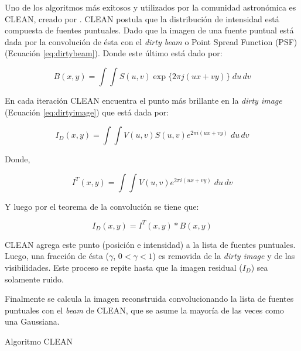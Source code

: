 Uno de los algoritmos más exitosos y utilizados por la comunidad astronómica es CLEAN, creado por \citep{hogbom}. CLEAN postula que la distribución de intensidad está compuesta de fuentes puntuales. Dado que la imagen de una fuente puntual está dada por la convolución de ésta con el \textit{dirty beam} o Point Spread Function (PSF) (Ecuación \ref{eq:dirtybeam}). Donde este último está dado por:

\begin{equation}
B(x,y) = \int\int S(u,v) \exp\{2\pi j(ux+vy)\} \;du\,dv
\label{eq:dirtybeam}
\end{equation}

En cada iteración CLEAN encuentra el punto más brillante en la \textit{dirty image} (Ecuación \ref{eq:dirtyimage}) que está dada por:

\begin{equation}
I_{D}(x,y) = \int\int V(u,v)S(u,v)e^{2\pi i(ux+vy)}\;du\,dv
\label{eq:dirtyimage}
\end{equation}

Donde,

\begin{equation}
I^{T}(x,y) = \int\int V(u,v)e^{2\pi i(ux+vy)}\;du\,dv
\label{eq:fullcoverage}
\end{equation} 

Y luego por el teorema de la convolución se tiene que:

\begin{equation}
I_{D}(x,y) = I^{T}(x,y) \ast B(x,y)
\end{equation}

CLEAN agrega este punto (posición e intensidad) a la lista de fuentes puntuales. Luego, una fracción de ésta ($\gamma$, $0 < \gamma < 1$) es removida de la \textit{dirty image} y de las visibilidades. Este proceso se repite hasta que la imagen residual ($I_D$) sea solamente ruido.

Finalmente se calcula la imagen reconstruida convolucionando la lista de fuentes puntuales con el \textit{beam} de CLEAN, que se asume la mayoría de las veces como una Gaussiana.

\begin{algorithm}
\begin{algorithmic}[1]
        \ENDFOR
    \ENDWHILE
\end{algorithmic}
\label{alg:clean}
\caption{Algoritmo CLEAN}
\end{algorithm}


